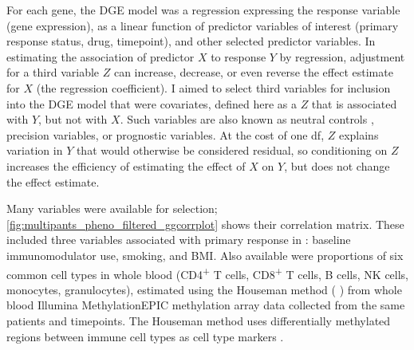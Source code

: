 For each gene, the \gls{DGE} model was a regression expressing the response variable (gene expression), 
as a linear function of predictor variables of interest (primary response status, drug, timepoint),
and other selected predictor variables.
In estimating the association of predictor $X$ to response $Y$ by regression, 
adjustment for a third variable $Z$ can increase, decrease, or even reverse the effect estimate for $X$ (the regression coefficient).
I aimed to select third variables for inclusion into the \gls{DGE} model that were covariates,
defined here as a $Z$ that is associated with $Y$, but not with $X$.
Such variables are also known as neutral controls \autocite{cinelli2020CrashCourseGood}, precision variables, or prognostic variables.
At the cost of one \gls{df},
$Z$ explains variation in $Y$ that would otherwise be considered residual,
so conditioning on $Z$ increases the efficiency of estimating the effect of $X$ on $Y$, but does not change the effect estimate.

Many variables were available for selection;
\cref{fig:multipants_pheno_filtered_ggcorrplot} shows their correlation matrix.
These included three variables associated with primary response in \textcite{kennedy2019PredictorsAntiTNFTreatment}: baseline immunomodulator use, smoking, and \gls{BMI}.
Also available were proportions of six common cell types in whole blood 
(CD4\textsuperscript{+} T cells, CD8\textsuperscript{+} T cells, B cells, \gls{NK} cells, monocytes, granulocytes),
estimated using the Houseman method ( \autocite{aryee2014MinfiFlexibleComprehensive})
from whole blood Illumina MethylationEPIC methylation array data collected from the same patients and timepoints.
The Houseman method uses differentially methylated regions between immune cell types as cell type markers \autocite{houseman2012DNAMethylationArrays}.


